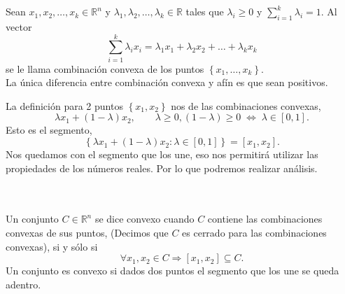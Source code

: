 \begin{def.}\,\\\\
    Sean $x_1,x_2,\ldots,x_k\in \mathbb{R}^n$ y $\lambda_1,\lambda_2,\ldots,\lambda_k\in \mathbb{R}$ tales que $\lambda_i\geq 0$ y $\displaystyle\sum_{i=1}^{k}\lambda_i=1$. Al vector
    $$\sum_{i=1}^{k}\lambda_ix_i=\lambda_1x_1+\lambda_2x_2+\ldots+\lambda_kx_k$$
    se le llama combinación convexa de los puntos $\left\{x_1,\ldots,x_k\right\}$.\\

	La única diferencia entre combinación convexa y afín es que sean positivos.
\end{def.}

\begin{obs}
    La definición para 2 puntos $\left\{x_1,x_2\right\}$ nos de las combinaciones convexas,
    $$\lambda x_1+(1-\lambda)x_2,\qquad \lambda\geq 0, (1-\lambda)\geq 0 \; \Leftrightarrow \; \lambda \in \left[0,1\right].$$
    Esto es el segmento,
    $$\left\{\lambda x_1+(1-\lambda)x_2: \lambda\in \left[0,1\right]\right\}=\left[x_1,x_2\right].$$
    Nos quedamos con el segmento que los une, eso nos permitirá utilizar las propiedades de los números reales. Por lo que podremos realizar análisis.
\end{obs}

\begin{def.}[convexo]\,\\\\
    Un conjunto $C\in \mathbb{R}^n$ se dice convexo cuando $C$ contiene las combinaciones convexas de sus puntos, (Decimos que $C$ es cerrado para las combinaciones convexas), si y sólo si
    $$\forall x_1,x_2\in C \Rightarrow \left[x_1,x_2\right]\subseteq C.$$
    Un conjunto es convexo si dados dos puntos el segmento que los une se queda adentro.
\end{def.}

